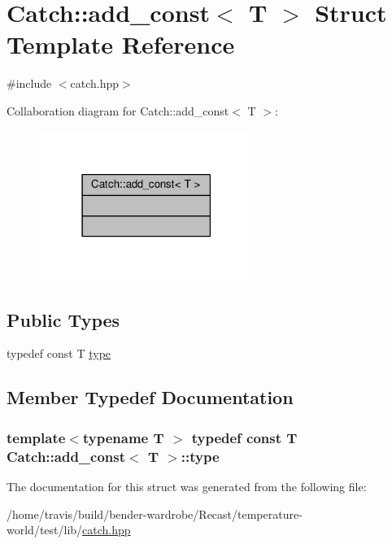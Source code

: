 \hypertarget{struct_catch_1_1add__const}{\section{Catch\-:\-:add\-\_\-const$<$ T $>$ Struct Template Reference}
\label{struct_catch_1_1add__const}
}


{\ttfamily \#include $<$catch.\-hpp$>$}



Collaboration diagram for Catch\-:\-:add\-\_\-const$<$ T $>$\-:
\nopagebreak
\begin{figure}[H]
\begin{center}
\leavevmode
\includegraphics[width=198pt]{struct_catch_1_1add__const__coll__graph}
\end{center}
\end{figure}
\subsection*{Public Types}
\begin{DoxyCompactItemize}
\item 
typedef const T \hyperlink{struct_catch_1_1add__const_a27941c0ea86767c25ad5094f0c552a8c}{type}
\end{DoxyCompactItemize}


\subsection{Member Typedef Documentation}
\hypertarget{struct_catch_1_1add__const_a27941c0ea86767c25ad5094f0c552a8c}{
\subsubsection[{type}]{\setlength{\rightskip}{0pt plus 5cm}template$<$typename T $>$ typedef const T {\bf Catch\-::add\-\_\-const}$<$ T $>$\-::{\bf type}}}\label{struct_catch_1_1add__const_a27941c0ea86767c25ad5094f0c552a8c}


The documentation for this struct was generated from the following file\-:\begin{DoxyCompactItemize}
\item 
/home/travis/build/bender-\/wardrobe/\-Recast/temperature-\/world/test/lib/\hyperlink{catch_8hpp}{catch.\-hpp}\end{DoxyCompactItemize}
